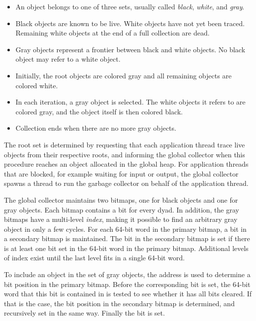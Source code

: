 \begin{itemize}
\item An object belongs to one of three sets, usually called
  \emph{black}, \emph{white}, and \emph{gray}.
\item Black objects are known to be live.  White objects have not yet
  been traced.  Remaining white objects at the end of a full
  collection are dead.
\item Gray objects represent a frontier between black and white
  objects.  No black object may refer to a white object.
\item Initially, the root objects are colored gray and all remaining
  objects are colored white.
\item In each iteration, a gray object is selected.  The white objects
  it refers to are colored gray, and the object itself is then colored
  black.
\item Collection ends when there are no more gray objects.
\end{itemize}

The root set is determined by requesting that each application thread
trace live objects from their respective roots, and informing the
global collector when this procedure reaches an object allocated in
the global heap. For application threads that are blocked, for example
waiting for input or output, the global collector spawns a thread to
run the garbage collector on behalf of the application thread.

The global collector maintains two bitmaps, one for black objects and
one for gray objects.  Each bitmap contains a bit for every dyad.  In
addition, the gray bitmaps have a multi-level \emph{index}, making it
possible to find an arbitrary gray object in only a few cycles.  For
each 64-bit word in the primary bitmap, a bit in a secondary bitmap is
maintained.  The bit in the secondary bitmap is set if there is at
least one bit set in the 64-bit word in the primary bitmap.
Additional levels of index exist until the last level fits in a single
64-bit word.

To include an object in the set of gray objects, the address is used
to determine a bit position in the primary bitmap.  Before the
corresponding bit is set, the 64-bit word that this bit is contained
in is tested to see whether it has all bits cleared.  If that is the
case, the bit position in the secondary bitmap is determined, and
recursively set in the same way.  Finally the bit is set.

